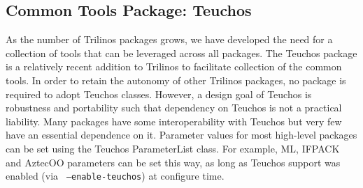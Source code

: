 \documentclass[12pt,relax]{TPA}
\begin{document}
\subsection{Common Tools Package: Teuchos}

As the number of Trilinos packages grows, we have developed the need
for a collection of tools that can be leveraged across all
packages.  The Teuchos package is a relatively recent addition to
Trilinos to facilitate collection of the common tools.  In order to
retain the autonomy of other Trilinos packages, no package is required
to adopt Teuchos classes.  However, a design goal of
Teuchos is robustness and portability such that dependency on Teuchos
is not a practical liability.  Many packages have some
interoperability with Teuchos but very few have an essential
dependence on it.  Parameter values for 
most high-level packages can be set using the Teuchos ParameterList
class.  For example, ML, IFPACK and AztecOO parameters can be set this
way, as long as Teuchos support was enabled (via {\tt
--enable-teuchos}) at configure time.
\end{document}
